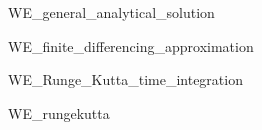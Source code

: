 \documentclass[a4paper,headsepline,12pt,oneside]{scrartcl}
\begin{document}
{WE_general_analytical_solution}

\clearpage

{WE_finite_differencing_approximation}
\clearpage

{WE_Runge_Kutta_time_integration}


\clearpage
\clearpage
\appendix
{WE_rungekutta}
\end{document}
